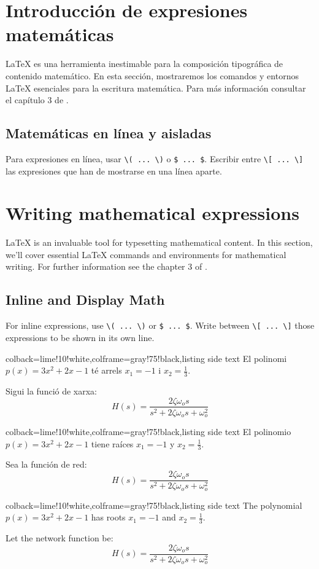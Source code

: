  \section{Introducción de expresiones matemáticas}
  
  \LaTeX{} es una herramienta inestimable para la composición tipográfica de contenido matemático. En esta sección, mostraremos los comandos y entornos LaTeX esenciales para la escritura matemática. Para más información consultar el capítulo 3 de \cite{notsoshort}.
  
  \subsection{Matemáticas en línea y aisladas}
  
  Para expresiones en línea, usar \verb|\( ... \)| o \verb|$ ... $|. Escribir entre \verb|\[ ... \]| las expresiones que han de mostrarse en una línea aparte.

\else
  \section{Writing mathematical expressions}
  
  \LaTeX{} is an invaluable tool for typesetting mathematical content. In this section, we'll cover essential LaTeX commands and environments for mathematical writing. For further information see the chapter 3 of \cite{notsoshort}.
  
  \subsection{Inline and Display Math}
  
  For inline expressions, use \verb|\( ... \)| or \verb|$ ... $|. Write between \verb|\[ ... \]| those expressions to be shown in its own line.
\fi


\ifcase\doclanguage\or
\begin{tcblisting}{colback=lime!10!white,colframe=gray!75!black,listing side text}
El polinomi $p(x) = 3x^2+2x-1$ t\'{e} arrels $x_1=-1$ i $x_2=\frac{1}{3}$.

Sigui la funci\'{o} de xarxa:
\[ H(s) = \frac{2\zeta\omega_o s}{s^2 + 2\zeta\omega_o s + \omega_o^2} \]
\end{tcblisting}%
%
\or
\begin{tcblisting}{colback=lime!10!white,colframe=gray!75!black,listing side text}
El polinomio $p(x) = 3x^2+2x-1$ tiene ra\'{i}ces $x_1=-1$ y $x_2=\frac{1}{3}$.

Sea la funci\'{o}n de red:
\[ H(s) = \frac{2\zeta\omega_o s}{s^2 + 2\zeta\omega_o s + \omega_o^2} \]
\end{tcblisting}
%
\else
\begin{tcblisting}{colback=lime!10!white,colframe=gray!75!black,listing side text}
The polynomial $p(x) = 3x^2 + 2x - 1$ has roots $x_1 = -1$ and $x_2 = \frac{1}{3}$.

Let the network function be:
\[ H(s) = \frac{2\zeta\omega_o s}{s^2 + 2\zeta\omega_o s + \omega_o^2} \]
\end{tcblisting}
\fi

